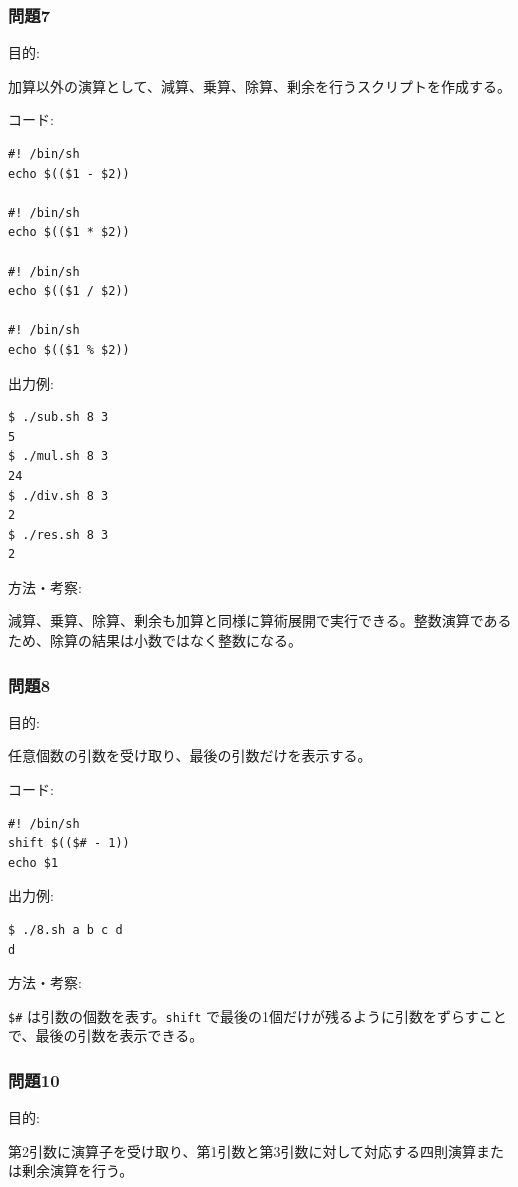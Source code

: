 \documentclass[12pt,a4paper]{jsarticle}
\begin{document}
\vspace{0.6cm}

\subsubsection*{問題7}
目的:\par
加算以外の演算として、減算、乗算、除算、剰余を行うスクリプトを作成する。

コード:\par
\begin{lstlisting}
#! /bin/sh
echo $(($1 - $2))

#! /bin/sh
echo $(($1 * $2))

#! /bin/sh
echo $(($1 / $2))

#! /bin/sh
echo $(($1 % $2))
\end{lstlisting}
出力例:\par
\begin{lstlisting}
$ ./sub.sh 8 3
5
$ ./mul.sh 8 3
24
$ ./div.sh 8 3
2
$ ./res.sh 8 3
2
\end{lstlisting}
方法・考察:\par
減算、乗算、除算、剰余も加算と同様に算術展開で実行できる。整数演算であるため、除算の結果は小数ではなく整数になる。

\vspace{0.6cm}

\subsubsection*{問題8}
目的:\par
任意個数の引数を受け取り、最後の引数だけを表示する。

コード:\par
\begin{lstlisting}
#! /bin/sh
shift $(($# - 1))
echo $1
\end{lstlisting}
出力例:\par
\begin{lstlisting}
$ ./8.sh a b c d
d
\end{lstlisting}
方法・考察:\par
\texttt{\$\#} は引数の個数を表す。\texttt{shift} で最後の1個だけが残るように引数をずらすことで、最後の引数を表示できる。

\vspace{0.6cm}

\subsubsection*{問題10}
目的:\par
第2引数に演算子を受け取り、第1引数と第3引数に対して対応する四則演算または剰余演算を行う。
\end{document}
